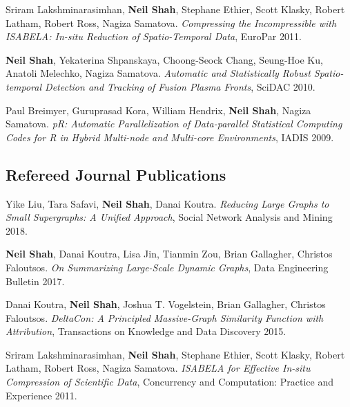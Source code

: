 \documentclass{article}
\begin{document}
\begin{etaremune}[itemsep=1pt,parsep=0pt]
\item Sriram Lakshminarasimhan, {\bf Neil Shah}, Stephane Ethier, Scott Klasky, Robert Latham, Robert Ross, Nagiza Samatova. \emph{Compressing the Incompressible with ISABELA: In-situ Reduction of Spatio-Temporal Data}, EuroPar 2011.

\item {\bf Neil Shah}, Yekaterina Shpanskaya, Choong-Seock Chang, Seung-Hoe Ku, Anatoli Melechko, Nagiza Samatova. \emph{Automatic and Statistically Robust Spatio-temporal Detection and Tracking of Fusion Plasma Fronts}, SciDAC 2010.

\item  Paul Breimyer, Guruprasad Kora, William Hendrix, {\bf Neil Shah}, Nagiza Samatova. \emph{pR: Automatic Parallelization of Data-parallel Statistical Computing Codes for R in Hybrid Multi-node and Multi-core Environments}, IADIS 2009.

\end{etaremune}


\subsection*{\bf {Refereed Journal Publications}}
\begin{etaremune}[itemsep=0pt,parsep=0pt]

\item Yike Liu, Tara Safavi, {\bf Neil Shah}, Danai Koutra. \emph{Reducing Large Graphs to Small Supergraphs: A Unified Approach}, Social Network Analysis and Mining 2018.

\item {\bf Neil Shah}, Danai Koutra, Lisa Jin, Tianmin Zou, Brian Gallagher, Christos Faloutsos. \emph{On Summarizing Large-Scale Dynamic Graphs}, Data Engineering Bulletin 2017.

\item Danai Koutra, {\bf Neil Shah}, Joshua T. Vogelstein, Brian Gallagher, Christos Faloutsos. \emph{DeltaCon: A Principled Massive-Graph Similarity Function with Attribution}, Transactions on Knowledge and Data Discovery 2015.

\item Sriram Lakshminarasimhan, {\bf Neil Shah}, Stephane Ethier, Scott Klasky, Robert Latham, Robert Ross, Nagiza Samatova. \emph{ISABELA for Effective In-situ Compression of Scientific Data}, Concurrency and Computation: Practice and Experience 2011.
	
\end{etaremune}
\end{document}
